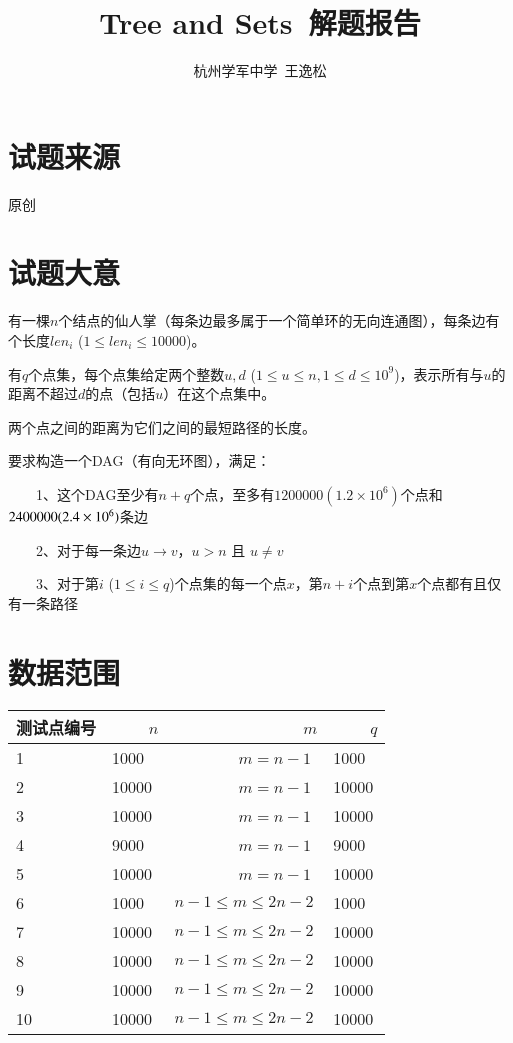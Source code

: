 \documentclass{noiassignment}
\begin{document}

\title{Tree and Sets\ 解题报告}
\author{杭州学军中学\ 王逸松}

\maketitle

\section{试题来源}

原创

\section{试题大意}

有一棵$n$个结点的仙人掌（每条边最多属于一个简单环的无向连通图），每条边有个长度$len_i$ ($1 \le len_i \le 10000$)。

有$q$个点集，每个点集给定两个整数$u, d$ ($1 \le u \le n, 1 \le d \le 10^9$)，表示所有与$u$的距离不超过$d$的点（包括$u$）在这个点集中。

两个点之间的距离为它们之间的最短路径的长度。

要求构造一个DAG（有向无环图），满足：

\ \ \ \ 1、这个DAG至少有$n+q$个点，至多有$1200000 (1.2 \times 10 ^ 6)$个点和$2400000 \newline \mbox{$(2.4 \times 10 ^ 6)$}$条边

\ \ \ \ 2、对于每一条边$u \rightarrow v$，$u > n$ 且 $u \ne v$

\ \ \ \ 3、对于第$i$ ($1 \le i \le q$)个点集的每一个点$x$，第$n+i$个点到第$x$个点都有且仅有一条路径


\section{数据范围}

\begin{tabular}{|l|l|l|l|}
\hline
测试点编号	&	\ \ \ \ $n$	&	\ \ \ \ \ \ \ \ \ \ \ \ \ \ $m$		&	\ \ \ \ $q$	\\
\hline
1			&		1000	&		\ \ \ \ \ \ \ \ $m = n - 1$		&		1000	\\
\hline
2			&		10000	&		\ \ \ \ \ \ \ \ $m = n - 1$		&		10000	\\
\hline
3			&		10000	&		\ \ \ \ \ \ \ \ $m = n - 1$		&		10000	\\
\hline
4			&		9000	&		\ \ \ \ \ \ \ \ $m = n - 1$		&		9000	\\
\hline
5			&		10000	&		\ \ \ \ \ \ \ \ $m = n - 1$		&		10000	\\
\hline
6			&		1000	&		$n - 1 \le m \le 2 n - 2$		&		1000	\\
\hline
7			&		10000	&		$n - 1 \le m \le 2 n - 2$		&		10000	\\
\hline
8			&		10000	&		$n - 1 \le m \le 2 n - 2$		&		10000	\\
\hline
9			&		10000	&		$n - 1 \le m \le 2 n - 2$		&		10000	\\
\hline
10			&		10000	&		$n - 1 \le m \le 2 n - 2$		&		10000	\\
\hline
\end{tabular}
\end{document}
